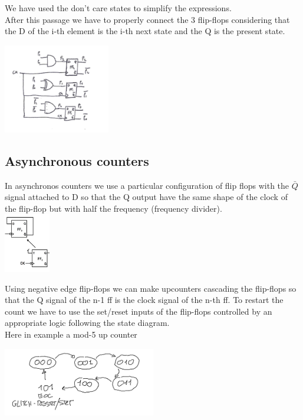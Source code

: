 We have used the don't care states to simplify the expressions.\\
After this passage we have to properly connect the 3 flip-flops considering that the D of the i-th element is the i-th next state and the Q is the present state.

\centering
\includegraphics[width=0.35\textwidth]{C10_21.png}\\
\raggedright

\subsection{Asynchronous counters}
In asynchronos counters we use a particular configuration of flip flops with the $\bar{Q}$ signal attached to D so that the Q output have the same shape of the clock of the flip-flop but with half the frequency (frequency divider).\\

\centering
\includegraphics[width=0.15\textwidth]{C10_22.png}\\
\raggedright

Using negative edge flip-flops we can make upcounters cascading the flip-flops so that the Q signal of the n-1 ff is the clock signal of the n-th ff.
To restart the count we have to use the set/reset inputs of the flip-flops controlled by an appropriate  logic following the state diagram.\\
Here in example a mod-5 up counter


\centering
\includegraphics[width=0.5\textwidth]{C10_23.png}\\
\raggedright


